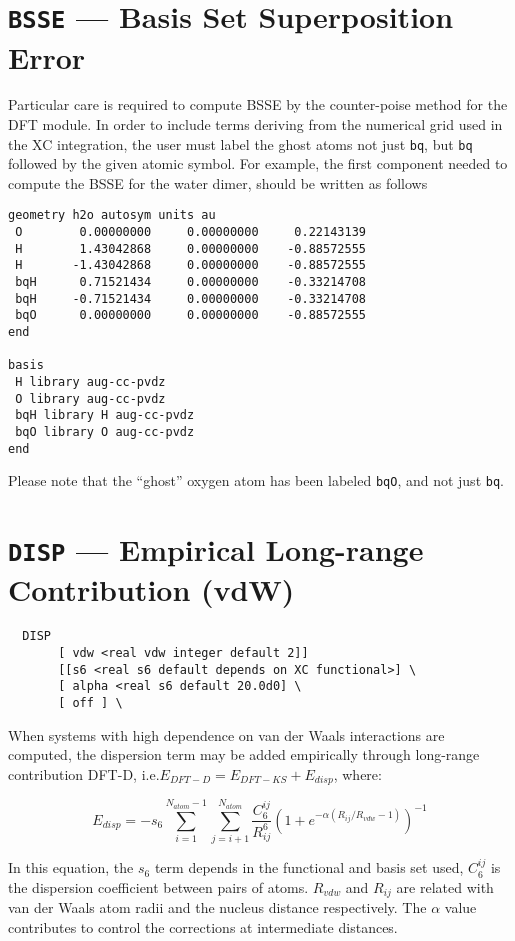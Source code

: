 \section{{\tt BSSE} --- Basis Set Superposition Error}

Particular care is required to compute BSSE by the counter-poise
method for the DFT module. In order to include terms deriving from
the numerical grid used in the XC integration, the user must label
the ghost atoms not just {\tt bq}, but {\tt bq} followed by the given
atomic symbol. For example, the first component needed to compute the
BSSE for the water dimer, should be written as follows

\begin{verbatim}
geometry h2o autosym units au
 O        0.00000000     0.00000000     0.22143139
 H        1.43042868     0.00000000    -0.88572555
 H       -1.43042868     0.00000000    -0.88572555
 bqH      0.71521434     0.00000000    -0.33214708
 bqH     -0.71521434     0.00000000    -0.33214708
 bqO      0.00000000     0.00000000    -0.88572555
end

basis
 H library aug-cc-pvdz
 O library aug-cc-pvdz
 bqH library H aug-cc-pvdz
 bqO library O aug-cc-pvdz
end
\end{verbatim}

Please note that the ``ghost'' oxygen atom has been labeled {\tt bqO},
and not just {\tt bq}.

\section{{\tt DISP} --- Empirical Long-range Contribution (vdW)}

\begin{verbatim}
  DISP 
       [ vdw <real vdw integer default 2]]
       [[s6 <real s6 default depends on XC functional>] \
       [ alpha <real s6 default 20.0d0] \
       [ off ] \
\end{verbatim}

When systems with high dependence on van der Waals interactions
are computed, the dispersion term may be added empirically 
through long-range contribution 
DFT-D, i.e.$ E_{DFT-D}=E_{DFT-KS}+E_{disp}$,
where:

$$ E_{disp}=-s_6\sum^{N_{atom}-1}_{i=1}\sum^{N_{atom}}_{j=i+1} 
\frac{C_{6}^{ij}}{R_{ij}^{6}}
\left( 1+e^{-\alpha (R_{ij}/R_{vdw}-1)}  \right)^{-1}$$

In this equation, the $s_6$ term depends in the functional and basis set used, $C_6^{ij}$ 
is the dispersion coefficient between pairs of atoms.
$R_{vdw}$ and $R_{ij}$ are related with van der Waals atom radii and
the nucleus distance respectively. The $\alpha$ value contributes to control the corrections
at intermediate distances.

